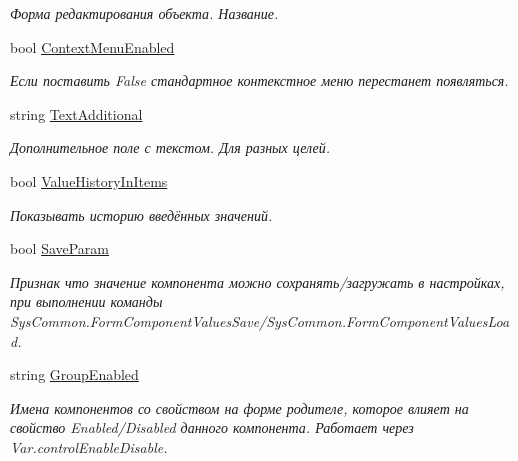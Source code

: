 \begin{DoxyCompactItemize}
\begin{DoxyCompactList}\small\item\em Форма редактирования объекта. Название. \end{DoxyCompactList}\item 
bool \mbox{\hyperlink{class_f_b_a_1_1_sys_d_b_edit_aba734b2bfab5cf5d2e96f305b89f10a1}{Context\+Menu\+Enabled}}
\begin{DoxyCompactList}\small\item\em Если поставить False стандартное контекстное меню перестанет появляться. \end{DoxyCompactList}\item 
string \mbox{\hyperlink{class_f_b_a_1_1_sys_d_b_edit_a75ea9d530622afa51e9dd7a6cb97c4c4}{Text\+Additional}}
\begin{DoxyCompactList}\small\item\em Дополнительное поле с текстом. Для разных целей. \end{DoxyCompactList}\item 
bool \mbox{\hyperlink{class_f_b_a_1_1_sys_d_b_edit_a58e553acebfbde3cf34399784797969b}{Value\+History\+In\+Items}}
\begin{DoxyCompactList}\small\item\em Показывать историю введённых значений. \end{DoxyCompactList}\item 
bool \mbox{\hyperlink{class_f_b_a_1_1_sys_d_b_edit_af7bc6ecb90f3c91426bab85c7eeca4f4}{Save\+Param}}
\begin{DoxyCompactList}\small\item\em Признак что значение компонента можно сохранять/загружать в настройках, при выполнении команды Sys\+Common.\+Form\+Component\+Values\+Save/\+Sys\+Common.Form\+Component\+Values\+Load. \end{DoxyCompactList}\item 
string \mbox{\hyperlink{class_f_b_a_1_1_sys_d_b_edit_af96c8fa2b4e9ba8c1445365621c56328}{Group\+Enabled}}
\begin{DoxyCompactList}\small\item\em Имена компонентов со свойством на форме родителе, которое влияет на свойство Enabled/\+Disabled данного компонента. Работает через Var.\+control\+Enable\+Disable. ~\newline

\end{DoxyCompactList}
\end{DoxyCompactItemize}
